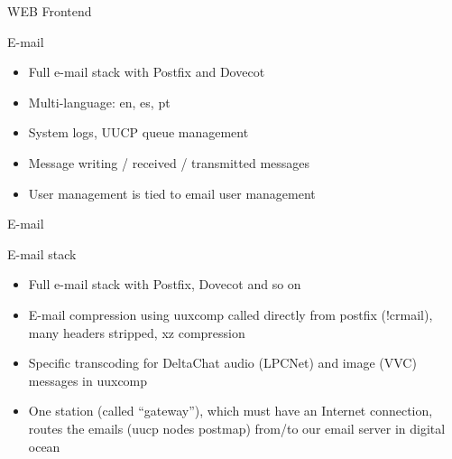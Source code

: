 \documentclass[aspectratio=169,xcolor={x11names,svgnames,dvipsnames}]{beamer}
\begin{document}
\begin{frame}{WEB Frontend}
\begin{center}
  \end{center}



  \begin{block}{E-mail}
  \begin{itemize}
  \item Full e-mail stack with Postfix and Dovecot
  \item Multi-language: en, es, pt
  \item System logs, UUCP queue management
  \item Message writing / received / transmitted messages
  \item User management is tied to email user management
  \end{itemize}
\end{block}

\end{frame}


\begin{frame}{E-mail}

\begin{block}{E-mail stack}
  \begin{itemize}
  \item Full e-mail stack with Postfix, Dovecot and so on
  \item E-mail compression using uuxcomp called directly from postfix (!crmail), many headers stripped, xz compression
  \item Specific transcoding for DeltaChat audio (LPCNet) and image (VVC) messages in uuxcomp
  \item One station (called ``gateway''), which must have an Internet connection, routes the emails (uucp nodes postmap) from/to
    our email server in digital ocean
  \end{itemize}
\end{block}

\vspace{-0.15cm}
\begin{center}

\end{center}



\end{frame}
\end{document}
